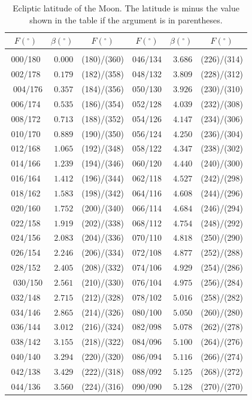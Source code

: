 \clearpage
\begin{table}[!h]
\vspace{0.25cm}
\centering
\small{ \begin{tabular}{crc|crc}
$F (^\circ)$ & $\beta(^\circ)$ & $F (^\circ)$ & $F (^\circ)$ & $\beta(^\circ)$ & $F (^\circ)$ \\\hline
&&\\[-1.75ex]
000/180 & $0.000$ & (180)/(360)  & 046/134 & $3.686$ & (226)/(314)\\
002/178 & $0.179$ & (182)/(358) & 048/132 & $3.809$ & (228)/(312)\\\
004/176 & $0.357$ & (184)/(356) &050/130 & $3.926$ & (230)/(310)\\
006/174 & $0.535$ & (186)/(354) & 052/128 & $4.039$ & (232)/(308)\\
008/172 & $0.713$ & (188)/(352) & 054/126 & $4.147$ & (234)/(306)\\
010/170 & $0.889$ & (190)/(350) & 056/124 & $4.250$ & (236)/(304)\\
012/168 & $1.065$ & (192)/(348) & 058/122 & $4.347$ & (238)/(302)\\
014/166 & $1.239$ & (194)/(346) & 060/120 & $4.440$ & (240)/(300)\\
016/164 & $1.412$ & (196)/(344) & 062/118 & $4.527$ & (242)/(298)\\
018/162 & $1.583$ & (198)/(342) & 064/116 & $4.608$ & (244)/(296)\\
020/160 & $1.752$ & (200)/(340) & 066/114 & $4.684$ & (246)/(294)\\
022/158 & $1.919$ & (202)/(338) & 068/112 & $4.754$ & (248)/(292)\\
024/156 & $2.083$ & (204)/(336) & 070/110 & $4.818$ & (250)/(290)\\
026/154 & $2.246$ & (206)/(334) & 072/108 & $4.877$ & (252)/(288)\\
028/152 & $2.405$ & (208)/(332) & 074/106 & $4.929$ & (254)/(286)\\\
030/150 & $2.561$ & (210)/(330) & 076/104 & $4.975$ & (256)/(284)\\
032/148 & $2.715$ & (212)/(328) & 078/102 & $5.016$ & (258)/(282)\\
034/146 & $2.865$ & (214)/(326) & 080/100 & $5.050$ & (260)/(280)\\
036/144 & $3.012$ & (216)/(324) & 082/098 & $5.078$ & (262)/(278)\\
038/142 & $3.155$ & (218)/(322) & 084/096 & $5.100$ & (264)/(276)\\
040/140 & $3.294$ & (220)/(320) & 086/094 & $5.116$ & (266)/(274)\\
042/138 & $3.429$ & (222)/(318) & 088/092 & $5.125$ & (268)/(272)\\
044/136 & $3.560$ & (224)/(316) & 090/090 & $5.128$ & (270)/(270)\\
\end{tabular}}
\caption{Ecliptic latitude of the Moon.  The latitude is minus the value shown
in the table if the argument is
in parentheses. }\label{tmoonb}
\end{table}

